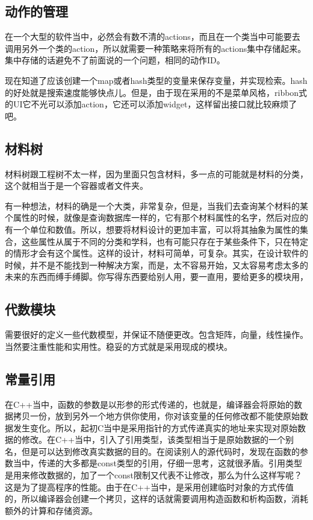 \subsection{动作的管理}
在一个大型的软件当中，必然会有数不清的actions，而且在一个类当中可能要去调用另外一个类的action，所以就需要一种策略来将所有的actions集中存储起来。集中存储的话避免不了前面说的一个问题，相同的动作ID。

现在知道了应该创建一个map或者hash类型的变量来保存变量，并实现检索。hash的好处就是搜索速度能够快点儿。但是，由于现在采用的不是菜单风格，ribbon式的UI它不光可以添加action，它还可以添加widget，这样留出接口就比较麻烦了吧。
\subsection{材料树}
材料树跟工程树不太一样，因为里面只包含材料，多一点的可能就是材料的分类，这个就相当于是一个容器或者文件夹。

有一种想法，材料的确是一个大类，非常复杂，但是，当我们去查询某个材料的某个属性的时候，就像是查询数据库一样的，它有那个材料属性的名字，然后对应的有一个单位和数值。所以，想要将材料设计的更加丰富，可以将其抽象为属性的集合，这些属性从属于不同的分类和学科，也有可能只存在于某些条件下，只在特定的情形才会有这个属性。这样的设计，材料可简单，可复杂。其实，在设计软件的时候，并不是不能找到一种解决方案，而是，太不容易开始，又太容易考虑太多的未来的东西而缚手缚脚。你写得东西要给别人用，要一直用，要给更多的模块用，
\subsection{代数模块}
需要很好的定义一些代数模型，并保证不随便更改。包含矩阵，向量，线性操作。当然要注重性能和实用性。稳妥的方式就是采用现成的模块。
\subsection{常量引用}
在C++当中，函数的参数是以形参的形式传递的，也就是，编译器会将原始的数据拷贝一份，放到另外一个地方供你使用，你对该变量的任何修改都不能使原始数据发生变化。所以，起初C当中是采用指针的方式传递真实的地址来实现对原始数据的修改。在C++当中，引入了引用类型，该类型相当于是原始数据的一个别名，但是可以达到修改真实数据的目的。在阅读别人的源代码时，发现在函数的参数当中，传递的大多都是const类型的引用，仔细一思考，这就很矛盾。引用类型是用来修改数据的，加了一个const限制又代表不让修改，那么为什么这样写呢？这是为了提高程序的性能。由于在C++当中，是采用创建临时对象的方式传值的，所以编译器会创建一个拷贝，这样的话就需要调用构造函数和析构函数，消耗额外的计算和存储资源。
